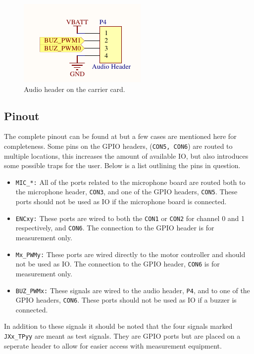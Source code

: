 \begin{figure}[h]
	\centering
	\includegraphics[width=0.4\linewidth]{graphics/audio_header.pdf}
	\caption{Audio header on the carrier card.}
	\label{fig:audio_header}
\end{figure}

\subsection{Pinout}
The complete pinout can be found at \cite{pinout} but a few cases are mentioned here for completeness.
Some pins on the GPIO headers, (\texttt{CON5, CON6}) are routed to multiple locations, this increases the amount of available IO, but also introduces some possible traps for the user.
Below is a list outlining the pins in question.

\begin{itemize}
	\item \texttt{MIC\_*:} All of the ports related to the microphone board are routed both to the microphone header, \texttt{CON3}, and one of the GPIO headers, \texttt{CON5}.
	These ports should not be used as IO if the microphone board is connected.
	\item \texttt{ENCxy:} These ports are wired to both the \texttt{CON1} or \texttt{CON2} for channel 0 and 1 respectively, and \texttt{CON6}.
	The connection to the GPIO header is for measurement only.
	\item \texttt{Mx\_PWMy:} These ports are wired directly to the motor controller and should not be used as IO.
	The connection to the GPIO header, \texttt{CON6} is for measurement only.
	\item \texttt{BUZ\_PWMx:} These signals are wired to the audio header, \texttt{P4}, and to one of the GPIO headers, \texttt{CON6}.
	These ports should not be used as IO if a buzzer is connected. 
\end{itemize}

In addition to these signals it should be noted that the four signals marked \texttt{JXx\_TPyy} are meant as test signals.
They are GPIO ports but are placed on a seperate header to allow for easier access with measurement equipment.

